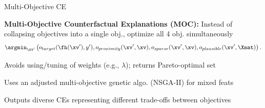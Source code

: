 \documentclass[10pt,compress,t,notes=noshow,xcolor=table]{beamer}
\begin{document}
\begin{framei}[align=top]{Multi-Objective CE }
\item \textbf{Multi-Objective Counterfactual Explanations (MOC):} Instead of collapsing objectives into a single obj., optimize all 4 obj. simultaneously
$$
\argmin_{\xv'} \left(o_{target}(\fh(\xv'), y'), o_{proximity}(\xv', \xv), o_{sparse}(\xv', \xv), o_{plausible}(\xv', \Xmat) \right).
$$
\item Avoids using/tuning of weights (e.g., $\lambda$); returns Pareto-optimal set
\item Uses an adjusted multi-objective genetic algo. (NSGA-II) for mixed feats %
\item Outputs diverse CEs representing different trade-offs between objectives
\end{framei}
\end{document}

